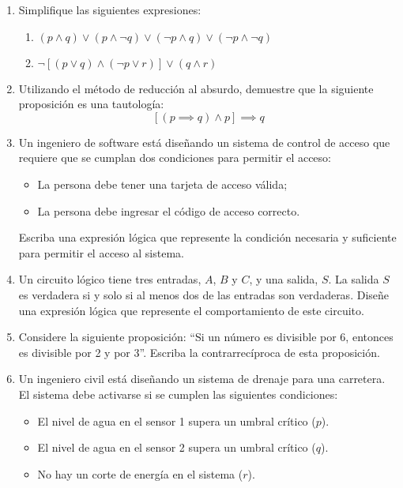 \begin{enumerate}[label=\textbf{\arabic*}.]
	\item Simplifique las siguientes expresiones:
	\begin{enumerate}[label=\alph*)]
		\item \( (p \land q) \lor (p \land \neg q) \lor (\neg p \land q) \lor (\neg p \land \neg q) \)
		\item $\neg [(p \lor q) \land (\neg p \lor r)] \lor (q \land r)$
	\end{enumerate}
	
	\item Utilizando el método de reducción al absurdo, demuestre que la siguiente proposición es una tautología:
	\[ \left[(p \implies q) \land p\right] \implies q \]
	
	\item Un ingeniero de software está diseñando un sistema de control de acceso que requiere que se cumplan dos condiciones para permitir el acceso:
	
	\begin{itemize}[itemsep=-2pt]
		\item La persona debe tener una tarjeta de acceso válida;
		\item La persona debe ingresar el código de acceso correcto.
	\end{itemize}
	Escriba una expresión lógica que represente la condición necesaria y suficiente para permitir el acceso al sistema.
	
	\item Un circuito lógico tiene tres entradas, $A$, $B$ y $C$, y una salida, $S$. La salida $S$ es verdadera si y solo si al menos dos de las entradas son verdaderas. Diseñe una expresión lógica que represente el comportamiento de este circuito.
	
	\item Considere la siguiente proposición: ``Si un número es divisible por 6, entonces es divisible por 2 y por 3''. Escriba la contrarrecíproca de esta proposición.
	
	\item Un ingeniero civil está diseñando un sistema de drenaje para una carretera. El sistema debe activarse si se cumplen las siguientes condiciones:
	\begin{itemize}[itemsep=-3pt]
		\item El nivel de agua en el sensor 1 supera un umbral crítico ($p$).
		\item El nivel de agua en el sensor 2 supera un umbral crítico ($q$).
		\item No hay un corte de energía en el sistema ($r$).
	\end{itemize}
	

\end{enumerate}
